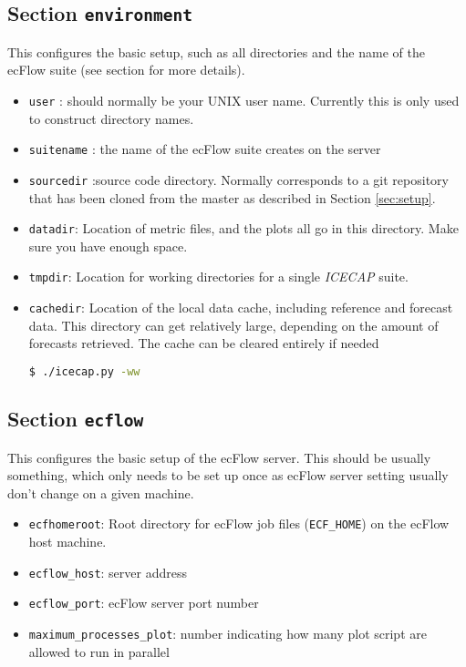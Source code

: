 \documentclass[DIV=10, parskip=full]{scrreprt}
\newcommand{\ice}{\textit{ICECAP}\xspace}
\begin{document}
\subsection{Section \texttt{environment}} \label{sec:environment}
This configures the basic setup, such as all directories and the name of the ecFlow suite (see section \label{sec:eflow} for more details).
\begin{itemize}
	\item \texttt{user} : should normally be your UNIX user name. Currently this is only used to construct directory names.
	\item \texttt{suitename} : the name of the ecFlow suite creates on the server 
	\item \texttt{sourcedir} :source code directory. Normally corresponds to a git repository that has been cloned from the master as described in Section \ref{sec:setup}.
	 \item \texttt{datadir}: Location of metric files, and the plots all go in this directory. Make sure you have enough space. 
	  \item \texttt{tmpdir}: Location for working directories for a single \ice suite.
	   \item \texttt{cachedir}: Location of the local data cache, including reference and forecast data. This directory can get relatively large, depending on the amount of forecasts retrieved. The cache can be cleared entirely if needed 
	   \begin{lstlisting}[language=bash, float]
	   	$ ./icecap.py -ww
	   \end{lstlisting}
\end{itemize}
	
\subsection{Section \texttt{ecflow}} \label{sec:ecflow}
This configures the basic setup of the ecFlow server. This should be usually something, which only needs to be set up once as ecFlow server setting usually don't change on a given machine.
\begin{itemize}
 	\item \texttt{ecfhomeroot}: Root directory for ecFlow job files (\texttt{ECF\_HOME}) on the ecFlow host machine.
 	\item \texttt{ecflow\_host}: server address
 	\item \texttt{ecflow\_port}: ecFlow server port number
 	\item \texttt{maximum\_processes\_plot}: number indicating how many plot script are allowed to run in parallel
 \end{itemize}
 
\end{document}
